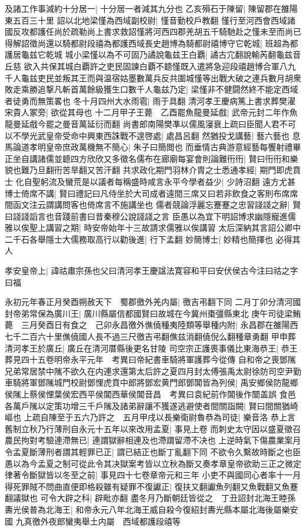 及諸工作事減約十分居一|{
	十分居一者減其九分也}
乙亥殞石于陳留|{
	陳留郡在雒陽東五百三十里}
詔以北地梁慬為西域副校尉|{
	慬音勤校戶教翻}
慬行至河西會西域諸國反攻都護任尚於疏勒尚上書求救詔慬將河西四郡羌胡五千騎馳赴之慬未至而尚已得解詔徵尚還以騎都尉段禧為都護西域長史趙博為騎都尉禧博守它乾城|{
	班超為都護居龜兹它乾城}
城小梁慬以為不可固乃譎說龜兹王白覇|{
	譎古宂翻說輸芮翻龜兹音丘慈}
欲入共保其城白覇許之吏民固諫白覇不聼慬既入遣將急迎段禧趙博合軍八九千人龜兹吏民並叛其王而與温宿姑墨數萬兵反共圍城慬等出戰大破之連兵數月胡衆敗走乘勝追撃凡斬首萬餘級獲生口數千人龜兹乃定|{
	梁慬非不健闘然終不能定西域者徒勇而無策畧也}
冬十月四州大水雨雹|{
	雨于具翻}
清河孝王慶病篤上書求葬樊濯宋貴人冢旁|{
	欲從其母也}
十二月甲子王薨　乙酉罷魚龍曼延戲|{
	武帝元封二年作魚龍曼延戲今罷之曼音萬延衍而翻}
尚書郎南陽樊凖以儒風寖衰上疏曰臣聞人君不可以不學光武皇帝受命中興東西誅戰不遑啓處|{
	處昌呂翻}
然猶投戈講藝|{
	藝六藝也}
息馬論道孝明皇帝庶政萬機無不簡心|{
	朱子曰簡閲也}
而垂情古典游意經藝每饗射禮畢正坐自講諸儒並聼四方欣欣又多徵名儒布在廊廟每宴會則論難衎衎|{
	賢曰衎衎和樂貌也難乃旦翻衎苦旱翻又苦汗翻}
共求政化期門羽林介胄之士悉通孝經|{
	期門即虎賁士}
化自聖躬流及蠻荒是以議者每稱盛時咸言永平今學者益少|{
	少詩沼翻}
遠方尤甚博士倚席不講|{
	賢曰禮記曰凡侍坐於大司成者遠間三席又曰若非飲食之客則布席席間函文注云謂講問客也倚席言不施講坐也}
儒者競論浮麗忘蹇蹇之忠習諓諓之辭|{
	賢曰諓諓謟言也音踐前書曰昔秦穆公說諓諓之言}
臣愚以為宜下明詔博求幽隱寵進儒雅以俟聖上講習之期|{
	時安帝始年十三故請求儒雅以俟講習}
太后深納其言詔公卿中二千石各舉隱士大儒務取高行以勸後進|{
	行下孟翻}
妙簡博士|{
	妙精也簡擇也}
必得其人

孝安皇帝上|{
	諱祜肅宗孫也父曰清河孝王慶諡法寛容和平曰安伏侯古今注曰祜之字曰福}


永初元年春正月癸酉朔赦天下　蜀郡徼外羌内屬|{
	徼吉弔翻下同}
二月丁卯分清河國封帝弟常保為廣川王|{
	廣川縣屬信都國賢曰故城在今冀州棗彊縣東北}
庚午司徒梁鮪薨　三月癸酉日有食之　己卯永昌徼外僬僥種夷陸類等舉種内附|{
	永昌郡在雒陽西七千二百六十里僬僥國人長不過三尺徼吉弔翻僬兹消翻僥倪么翻種章勇翻}
甲申葬清河孝王於廣丘|{
	廣丘在清河厝縣後更名甘陵}
司空宗正護喪事儀比東海恭王|{
	恭王葬見四十五卷明帝永平元年　考異曰帝紀書車騎將軍護葬今從傳}
自和帝之喪鄧隲兄弟常居禁中隲不欲久在内連求還第太后許之夏四月封太傅張禹太尉徐防司空尹勤車騎將軍鄧隲城門校尉鄧悝虎賁中郎將鄧宏黄門郎鄧閶皆為列侯|{
	禹安鄉侯防龍鄉侯隲上蔡侯悝葉侯宏西平侯閶西華侯閶音昌　考異曰袁紀前作閶後作闓盖誤}
食邑各萬戶隲以定策功增三千戶隲及諸弟辭讓不獲遂逃避使者間關詣闕|{
	賢曰間關猶崎嶇也}
上疏自陳至于五六乃許之　五月甲戌以長樂衛尉魯恭為司徒|{
	樂音洛}
恭上言舊制立秋乃行薄刑自永元十五年以來改用孟夏|{
	事見上卷}
而刺史太守因以盛夏徵召農民拘對考驗連滯無已|{
	連謂獄辭相連及也滯謂留滯不决也}
上逆時氣下傷農業案月令孟夏斷薄刑者謂其輕罪已正|{
	謂已結正也斷丁亂翻下同}
不欲令久繫故時斷之也臣愚以為今孟夏之制可從此令其决獄案考皆以立秋為斷又奏孝章皇帝欲助三正之微定律著令斷獄皆以冬至之前|{
	事見四十七卷章帝元和三年}
小吏不與國同心者率十一月得死罪賊不問曲直便即格殺雖有疑罪不復讞正|{
	復扶又翻讞魚列翻又魚戰翻又魚蹇翻議獄也}
可令大辟之科|{
	辟毗亦翻}
盡冬月乃斷朝廷皆從之　丁丑詔封北海王睦孫夀光侯普為北海王|{
	和帝永元八年北海王威自殺今復紹封夀光縣本屬北海後屬樂安國}
九真徼外夜郎蠻夷舉土内屬　西域都護段禧等

